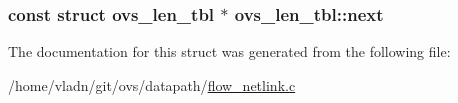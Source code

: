 \subsubsection[{next}]{\setlength{\rightskip}{0pt plus 5cm}const struct {\bf ovs\+\_\+len\+\_\+tbl} $\ast$ ovs\+\_\+len\+\_\+tbl\+::next}\label{structovs__len__tbl_a0def32b4bc5790a24631d4d7727954af}


The documentation for this struct was generated from the following file\+:\begin{DoxyCompactItemize}
\item 
/home/vladn/git/ovs/datapath/\hyperlink{flow__netlink_8c}{flow\+\_\+netlink.\+c}\end{DoxyCompactItemize}
